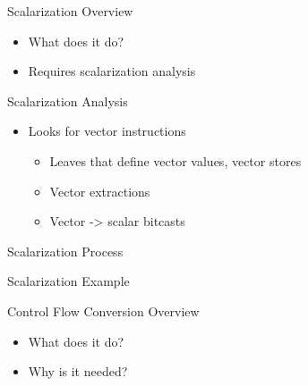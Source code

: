 
\begin{frame}{Scalarization Overview}

\begin{itemize}
    \item What does it do?
    \item Requires scalarization analysis
\end{itemize}

\end{frame}


\begin{frame}{Scalarization Analysis}

\begin{itemize}
    \item Looks for vector instructions
    \begin{itemize}
        \item Leaves that define vector values, vector stores
        \item Vector extractions
        \item Vector -> scalar bitcasts
    \end{itemize}
    
\end{itemize}

\end{frame}


\begin{frame}{Scalarization Process}


\end{frame}


\begin{frame}{Scalarization Example}


\end{frame}



\begin{frame}{Control Flow Conversion Overview}

\begin{itemize}
    \item What does it do?
    \item Why is it needed?
\end{itemize}

\end{frame}

